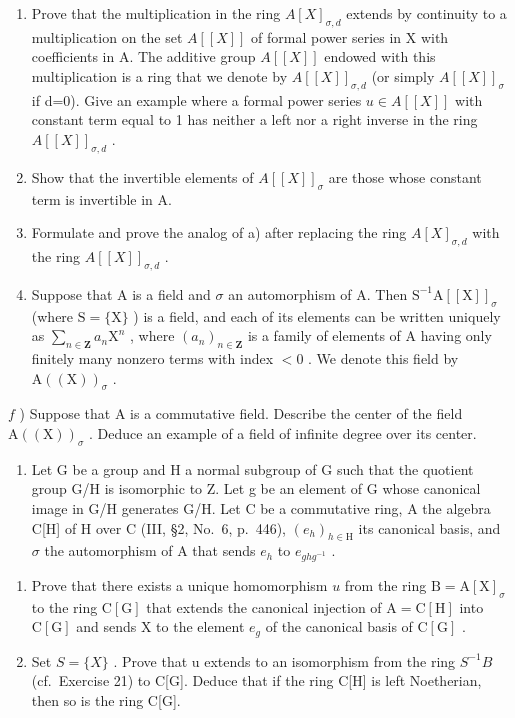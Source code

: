 \begin{enumerate}
\def\labelenumi{\alph{enumi})}
\setcounter{enumi}{1}
\item
  Prove that the multiplication in the ring \(A[X]_{\sigma,d}\) extends by continuity to a multiplication on the set \(A[[X]]\) of formal power series in X with coefficients in A. The additive group \(A[[X]]\) endowed with this multiplication is a ring that we denote by \(A[[X]]_{\sigma,d}\) (or simply \(A[[X]]_{\sigma}\) if d=0). Give an example where a formal power series \(u\in A[[X]]\) with constant term equal to 1 has neither a left nor a right inverse in the ring \(A[[X]]_{\sigma,d}\) .
\item
  Show that the invertible elements of \(A[[X]]_{\sigma}\) are those whose constant term is invertible in A.
\item
  Formulate and prove the analog of a) after replacing the ring \(A[X]_{\sigma,d}\) with the ring \(A[[X]]_{\sigma,d}\) .
\item
  Suppose that A is a field and \(\sigma\) an automorphism of A. Then \(\mathrm{S}^{-1}\mathrm{A}[[\mathrm{X}]]_{\sigma}\) (where \(\mathrm{S} = \{\mathrm{X}\}\) ) is a field, and each of its elements can be written uniquely as \(\sum_{n\in \mathbf{Z}}a_n\mathrm{X}^n\) , where \((a_{n})_{n\in \mathbf{Z}}\) is a family of elements of A having only finitely many nonzero terms with index \(< 0\) . We denote this field by \(\mathrm{A}((\mathrm{X}))_{\sigma}\) .
\end{enumerate}

\(f\) ) Suppose that A is a commutative field. Describe the center of the field \(\mathrm{A}((\mathrm{X}))_{\sigma}\) . Deduce an example of a field of infinite degree over its center.

\begin{enumerate}
\def\labelenumi{\arabic{enumi})}
\setcounter{enumi}{21}
\tightlist
\item
  Let G be a group and H a normal subgroup of G such that the quotient group G/H is isomorphic to Z. Let g be an element of G whose canonical image in G/H generates G/H. Let C be a commutative ring, A the algebra C{[}H{]} of H over C (III, §2, No.~6, p.~446), \((e_{h})_{h\in\mathrm{H}}\) its canonical basis, and \(\sigma\) the automorphism of A that sends \(e_{h}\) to \(e_{ghg^{-1}}\) .
\end{enumerate}

\begin{enumerate}
\def\labelenumi{\alph{enumi})}
\item
  Prove that there exists a unique homomorphism \(u\) from the ring \(\mathrm{B} = \mathrm{A}[\mathrm{X}]_{\sigma}\) to the ring \(\mathrm{C}[\mathrm{G}]\) that extends the canonical injection of \(\mathrm{A} = \mathrm{C}[\mathrm{H}]\) into \(\mathrm{C}[\mathrm{G}]\) and sends \(\mathrm{X}\) to the element \(e_g\) of the canonical basis of \(\mathrm{C}[\mathrm{G}]\) .
\item
  Set \(S = \{X\}\) . Prove that u extends to an isomorphism from the ring \(S^{-1}B\) (cf.~Exercise 21) to C{[}G{]}. Deduce that if the ring C{[}H{]} is left Noetherian, then so is the ring C{[}G{]}.
\end{enumerate}

